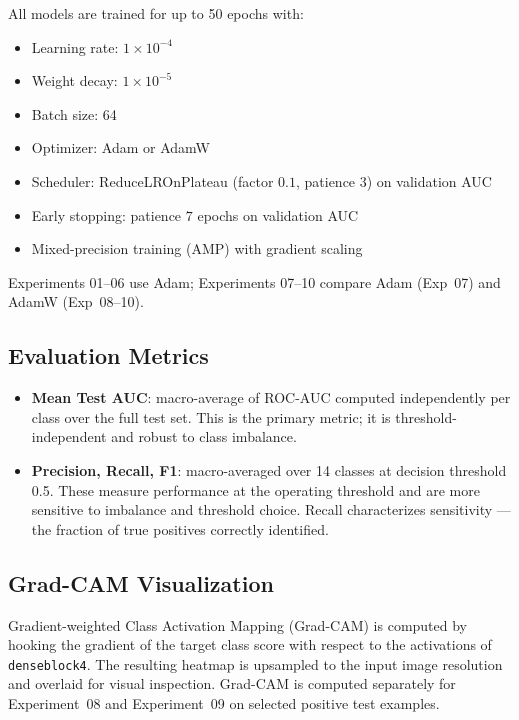 All models are trained for up to 50 epochs with:
\begin{itemize}
  \item Learning rate: $1{\times}10^{-4}$
  \item Weight decay: $1{\times}10^{-5}$
  \item Batch size: 64
  \item Optimizer: Adam or AdamW
  \item Scheduler: ReduceLROnPlateau (factor $0.1$, patience $3$) on validation AUC
  \item Early stopping: patience $7$ epochs on validation AUC
  \item Mixed-precision training (AMP) with gradient scaling
\end{itemize}

Experiments 01--06 use Adam; Experiments 07--10 compare Adam (Exp~07) and AdamW (Exp~08--10).

\subsection{Evaluation Metrics}

\begin{itemize}
  \item \textbf{Mean Test AUC}: macro-average of ROC-AUC computed independently per class over the full test set.
    This is the primary metric; it is threshold-independent and robust to class imbalance.
  \item \textbf{Precision, Recall, F1}: macro-averaged over 14 classes at decision threshold 0.5.
    These measure performance at the operating threshold and are more sensitive to imbalance and threshold choice.
    Recall characterizes sensitivity — the fraction of true positives correctly identified.
\end{itemize}

\subsection{Grad-CAM Visualization}

Gradient-weighted Class Activation Mapping (Grad-CAM) is computed by hooking the gradient of the target class score with respect to the activations of \texttt{denseblock4}.
The resulting heatmap is upsampled to the input image resolution and overlaid for visual inspection.
Grad-CAM is computed separately for Experiment~08 and Experiment~09 on selected positive test examples.
